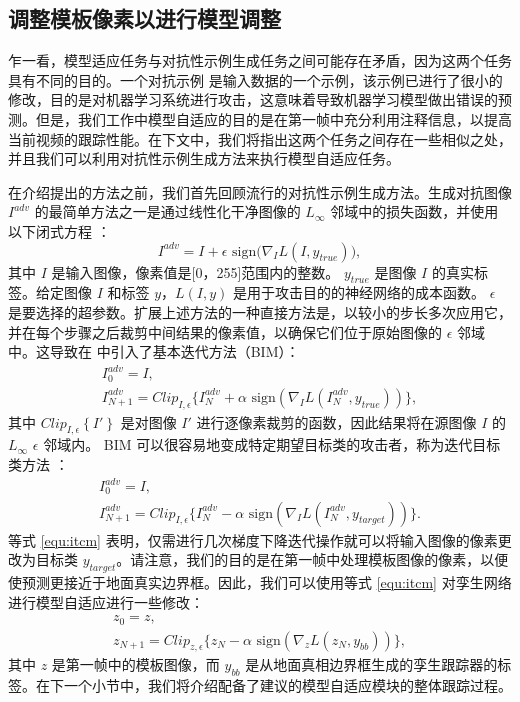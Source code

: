 \subsection{调整模板像素以进行模型调整}
乍一看，模型适应任务与对抗性示例生成任务之间可能存在矛盾，因为这两个任务具有不同的目的。一个对抗示例 \cite{kurakin2017adversarial} 是输入数据的一个示例，该示例已进行了很小的修改，目的是对机器学习系统进行攻击，这意味着导致机器学习模型做出错误的预测。但是，我们工作中模型自适应的目的是在第一帧中充分利用注释信息，以提高当前视频的跟踪性能。在下文中，我们将指出这两个任务之间存在一些相似之处，并且我们可以利用对抗性示例生成方法来执行模型自适应任务。

在介绍提出的方法之前，我们首先回顾流行的对抗性示例生成方法。生成对抗图像 $I^{adv}$ 的最简单方法之一是通过线性化干净图像的 $L_{\infty}$ 邻域中的损失函数，并使用以下闭式方程 \cite{FGSM}：
\begin{equation}
    I^{adv} = I + \epsilon \text{ sign} \bigl( \nabla_I L(I, y_{true})  \bigr),
\end{equation}
其中 $I$ 是输入图像，像素值是[0，255]范围内的整数。 $y_{true}$ 是图像 $I$ 的真实标签。给定图像 $I$ 和标签 $y$，$L(I, y)$ 是用于攻击目的的神经网络的成本函数。 $\epsilon$ 是要选择的超参数。扩展上述方法的一种直接方法是，以较小的步长多次应用它，并在每个步骤之后裁剪中间结果的像素值，以确保它们位于原始图像的 $\epsilon$ 邻域中。这导致在 \cite{kurakin2017adversarial} 中引入了基本迭代方法（BIM）：
\begin{equation}
    \begin{gathered}
        I_0^{adv} = I, \\
        I_{N+1}^{adv} = Clip_{I,\epsilon}\{I_N^{adv}+\alpha \text{ sign}(\nabla_I L(I_N^{adv},y_{true}))\},
    \end{gathered}
\end{equation}
其中 $Clip_{I, \epsilon} \left\{ I' \right\}$ 是对图像 $I'$ 进行逐像素裁剪的函数，因此结果将在源图像 $I$ 的 $L_{\infty}$ $\epsilon$ 邻域内。
BIM 可以很容易地变成特定期望目标类的攻击者，称为迭代目标类方法 \cite{kurakin2017adversarial}：
\begin{equation}
    \begin{gathered}
        I_0^{adv} = I,\\
        I_{N+1}^{adv} = Clip_{I,\epsilon}\{I_N^{adv}-\alpha \text{ sign}(\nabla_I L(I_N^{adv},y_{target}))\}.
    \end{gathered}
    \label{equ:itcm}
\end{equation}
等式 \ref{equ:itcm} 表明，仅需进行几次梯度下降迭代操作就可以将输入图像的像素更改为目标类 $y_{target}$。请注意，我们的目的是在第一帧中处理模板图像的像素，以便使预测更接近于地面真实边界框。因此，我们可以使用等式 \ref{equ:itcm} 对孪生网络进行模型自适应进行一些修改：
\begin{equation}
    \begin{gathered}
        z_0 = z,\\
        z_{N+1} = Clip_{z,\epsilon}\{z_N -\alpha \text{ sign}(\nabla_z L(z_N,y_{bb}))\},
    \end{gathered}
    \label{equ:adaptaion}
\end{equation}
其中 $z$ 是第一帧中的模板图像，而 $y_{bb}$ 是从地面真相边界框生成的孪生跟踪器的标签。在下一个小节中，我们将介绍配备了建议的模型自适应模块的整体跟踪过程。

